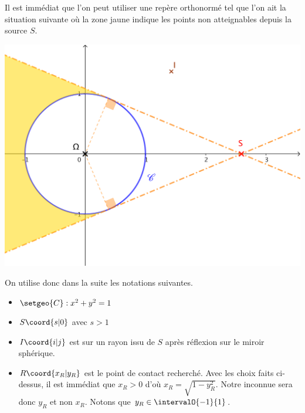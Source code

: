 Il est immédiat que l'on peut utiliser une repère orthonormé tel que l'on ait la situation suivante où la zone jaune indique les points non atteignables depuis la source $S$.


\begin{center}
	\includegraphics[scale=.75]{standard.png}
\end{center}


On utilise donc dans la suite les notations suivantes.

\begin{itemize}[label=\small\textbullet]
	\item $\setgeo{C} : x^2 + y^2 = 1$

	\item $S\coord{s | 0}$ avec $s > 1$

	\item $I\coord{i | j}$ est sur un rayon issu de $S$ après réflexion sur le miroir sphérique.

	\item $R\coord{x_R | y_R}$ est le point de contact recherché. Avec les choix faits ci-dessus, il est immédiat que $x_R > 0$ d'où $x_R = \sqrt{1 - y_R^2}$. Notre inconnue sera donc $y_R$ et non $x_R$. Notons que $y_R \in \intervalO{-1}{1}$.
\end{itemize}

